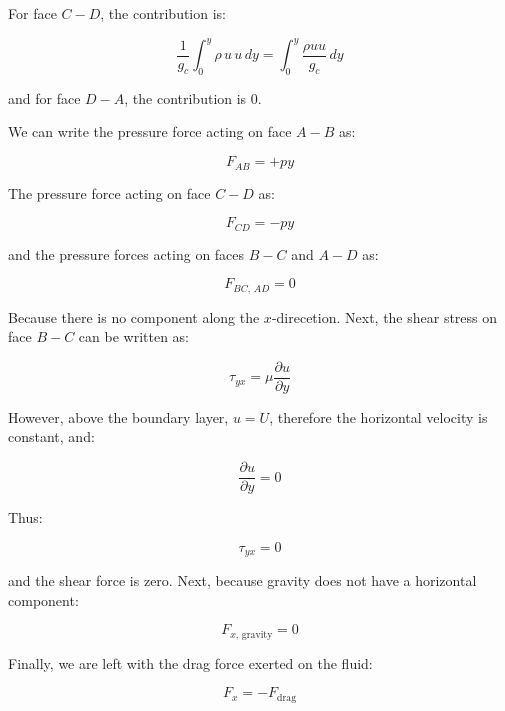 \documentclass[letterpaper,12pt]{article}
\begin{document}
For face $C-D$, the contribution is:

\begin{equation}
    \frac{1}{g_c}\int_0^y\rho\,u\,u\,dy=\int_0^y\frac{\rho uu}{g_c}\,dy
\end{equation}

and for face $D-A$, the contribution is $0$.

We can write the pressure force acting on face $A-B$ as:

\begin{equation}
    F_{AB}=+py
\end{equation}

The pressure force acting on face $C-D$ as:

\begin{equation}
    F_{CD}=-py
\end{equation}

and the pressure forces acting on faces $B-C$ and $A-D$ as:

\begin{equation}
    F_{BC, \, AD} = 0
\end{equation}

Because there is no component along the $x$-direcetion. Next, the shear stress on face $B-C$ can be written as:

\begin{equation}
    \tau_{yx}=\mu\frac{\partial u}{\partial y}
\end{equation}

However, above the boundary layer, $u = U$, therefore the horizontal velocity is constant, and:

\begin{equation}
    \frac{\partial u}{\partial y}=0
\end{equation}

Thus:

\begin{equation}
    \tau_{yx}=0
\end{equation}

and the shear force is zero. Next, because gravity does not have a horizontal component:

\begin{equation}
    F_{x, \, \text{gravity}} = 0
\end{equation}

Finally, we are left with the drag force exerted on the fluid:

\begin{equation}
    F_x = -F_{\text{drag}}
\end{equation}
\end{document}
